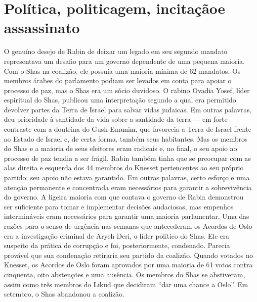 \chapter*{Política, politicagem, incitação\break e assassinato\smallskip{}}

O genuíno desejo de Rabin de deixar um legado em seu segundo mandato
representava um desafio para um governo dependente de uma pequena
maioria. Com o Shas na coalizão, ele possuía uma maioria mínima de 62
mandatos. Os membros árabes do parlamento podiam ser levados em conta
para apoiar o processo de paz, mas o Shas era um sócio duvidoso. O rabino Ovadia Yosef, líder espiritual do Shas, publicou uma interpretação
segundo a qual era permitido devolver partes da Terra de Israel para
salvar vidas judaicas. Em outras palavras, deu prioridade à santidade da
vida sobre a santidade da terra --- em forte contraste com a doutrina do
Gush Emunim, que favorecia a Terra de Israel frente ao Estado de Israel
e, de certa forma, também seus habitantes. Mas os membros do Shas e a
maioria de seus eleitores eram radicais e, no final, o seu apoio ao
processo de paz tendia a ser frágil. Rabin também tinha que se preocupar
com as alas direita e esquerda dos 44 membros do Knesset
pertencentes ao seu próprio partido; seu apoio não estava garantido. Em
outras palavras, certo esforço e uma atenção permanente e concentrada eram
necessários para garantir a sobrevivência do governo. A ligeira maioria
com que contava o governo de Rabin demonstrou ser suficiente para tomar
e implementar decisões audaciosas, mas empenhos intermináveis eram
necessários para garantir uma maioria parlamentar. Uma das razões para o
senso de urgência nas semanas que antecederam os Acordos de Oslo era a
investigação criminal de Aryeh Deri, o líder político do Shas. Ele era
suspeito da prática de corrupção e foi, posteriormente, condenado.
Parecia provável que sua condenação retiraria seu partido da coalizão.
Quando votados no Knesset, os Acordos de Oslo foram aprovados por
uma maioria de 61 votos contra cinquenta, oito abstenções e
uma ausência. Os membros do Shas se abstiveram, assim como três membros
do Likud que decidiram ``dar uma chance a Oslo''. Em setembro, o Shas
abandonou a coalizão.

